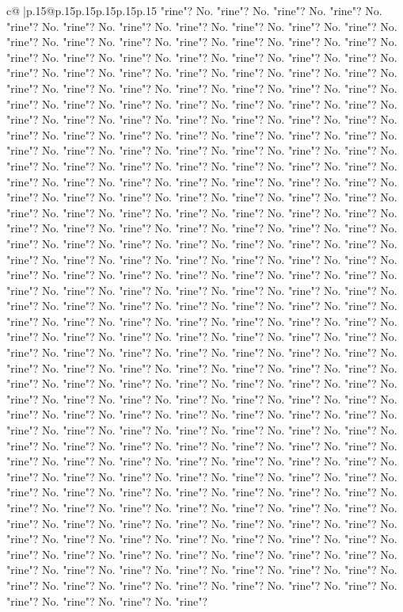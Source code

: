 \documentclass{article}
\begin{document}
{\begin{supertabular}{c@{$\;$}|p{.15\linewidth}@{}p{.15\linewidth}p{.15\linewidth}p{.15\linewidth}p{.15\linewidth}p{.15\linewidth}}
{{{"rine"? No. "rine"? No. "rine"? No. "rine"? No. "rine"? No. "rine"? No. "rine"? No. "rine"? No. "rine"? No. "rine"? No. "rine"? No. "rine"? No. "rine"? No. "rine"? No. "rine"? No. "rine"? No. "rine"? No. "rine"? No. "rine"? No. "rine"? No. "rine"? No. "rine"? No. "rine"? No. "rine"? No. "rine"? No. "rine"? No. "rine"? No. "rine"? No. "rine"? No. "rine"? No. "rine"? No. "rine"? No. "rine"? No. "rine"? No. "rine"? No. "rine"? No. "rine"? No. "rine"? No. "rine"? No. "rine"? No. "rine"? No. "rine"? No. "rine"? No. "rine"? No. "rine"? No. "rine"? No. "rine"? No. "rine"? No. "rine"? No. "rine"? No. "rine"? No. "rine"? No. "rine"? No. "rine"? No. "rine"? No. "rine"? No. "rine"? No. "rine"? No. "rine"? No. "rine"? No. "rine"? No. "rine"? No. "rine"? No. "rine"? No. "rine"? No. "rine"? No. "rine"? No. "rine"? No. "rine"? No. "rine"? No. "rine"? No. "rine"? No. "rine"? No. "rine"? No. "rine"? No. "rine"? No. "rine"? No. "rine"? No. "rine"? No. "rine"? No. "rine"? No. "rine"? No. "rine"? No. "rine"? No. "rine"? No. "rine"? No. "rine"? No. "rine"? No. "rine"? No. "rine"? No. "rine"? No. "rine"? No. "rine"? No. "rine"? No. "rine"? No. "rine"? No. "rine"? No. "rine"? No. "rine"? No. "rine"? No. "rine"? No. "rine"? No. "rine"? No. "rine"? No. "rine"? No. "rine"? No. "rine"? No. "rine"? No. "rine"? No. "rine"? No. "rine"? No. "rine"? No. "rine"? No. "rine"? No. "rine"? No. "rine"? No. "rine"? No. "rine"? No. "rine"? No. "rine"? No. "rine"? No. "rine"? No. "rine"? No. "rine"? No. "rine"? No. "rine"? No. "rine"? No. "rine"? No. "rine"? No. "rine"? No. "rine"? No. "rine"? No. "rine"? No. "rine"? No. "rine"? No. "rine"? No. "rine"? No. "rine"? No. "rine"? No. "rine"? No. "rine"? No. "rine"? No. "rine"? No. "rine"? No. "rine"? No. "rine"? No. "rine"? No. "rine"? No. "rine"? No. "rine"? No. "rine"? No. "rine"? No. "rine"? No. "rine"? No. "rine"? No. "rine"? No. "rine"? No. "rine"? No. "rine"? No. "rine"? No. "rine"? No. "rine"? No. "rine"? No. "rine"? No. "rine"? No. "rine"? No. "rine"? No. "rine"? No. "rine"? No. "rine"? No. "rine"? No. "rine"? No. "rine"? No. "rine"? No. "rine"? No. "rine"? No. "rine"? No. "rine"? No. "rine"? No. "rine"? No. "rine"? No. "rine"? No. "rine"? No. "rine"? No. "rine"? No. "rine"? No. "rine"? No. "rine"? No. "rine"? No. "rine"? No. "rine"? No. "rine"? No. "rine"? No. "rine"? No. "rine"? No. "rine"? No. "rine"? No. "rine"? No. "rine"? No. "rine"? No. "rine"? No. "rine"? No. "rine"? No. "rine"? No. "rine"? No. "rine"? No. "rine"? No. "rine"? No. "rine"? No. "rine"? No. "rine"? No. "rine"? No. "rine"? No. "rine"? No. "rine"? No. "rine"? No. "rine"? No. "rine"? No. "rine"? No. "rine"? No. "rine"? No. "rine"? No. "rine"? No. "rine"? No. "rine"? No. "rine"? No. "rine"? No. "rine"? No. "rine"? No. "rine"? No. "rine"? No. "rine"? No. "rine"? No. "rine"? No. "rine"? No. "rine"? No. "rine"? No. "rine"? No. "rine"? No. "rine"? No. "rine"? No. "rine"? No. "rine"? No. "rine"? No. "rine"? No. "rine"? No. "rine"? No. "rine"? No. "rine"? No. "rine"? No. "rine"? No. "rine"? No. "rine"? No. "rine"? No. "rine"? No. "rine"? No. "rine"? No. "rine"? No. "rine"? No. "rine"? No. "rine"? No. "rine"? No. "rine"? No. "rine"? No. "rine"? No. "rine"? No. "rine"? }}}
\end{supertabular}}
\end{document}
